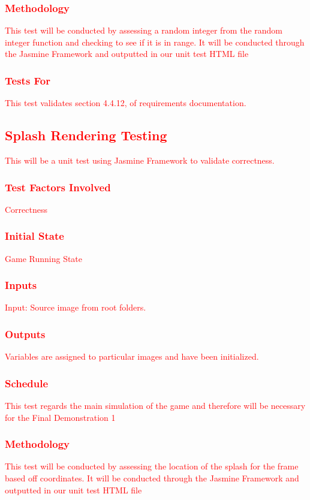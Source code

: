 \documentclass[11pt, oneside]{article}   	%
\begin{document}
\subsubsection{\textcolor{red}{Methodology}}
\textcolor{red}{This test will be conducted by assessing a random integer from the random integer function and checking to see if it is in range. It will be conducted through the Jasmine Framework and outputted in our unit test HTML file}
\subsubsection{\textcolor{red}{Tests For}}
\textcolor{red}{This test validates section 4.4.12, of requirements documentation.}


\subsection{\textcolor{red}{Splash Rendering Testing}}
\textcolor{red}{This will be a unit test using Jasmine Framework to validate correctness.}
\subsubsection{\textcolor{red}{Test Factors Involved}}
\textcolor{red}{Correctness}
\subsubsection{\textcolor{red}{Initial State}}
\textcolor{red}{Game Running State}
\subsubsection{\textcolor{red}{Inputs}}
\textcolor{red}{Input: Source image from root folders.}
\subsubsection{\textcolor{red}{Outputs}}
\textcolor{red}{Variables are assigned to particular images and have been initialized.}
\subsubsection{\textcolor{red}{Schedule}}
\textcolor{red}{This test regards the main simulation of the game and therefore will be necessary for the Final Demonstration 1}
\subsubsection{\textcolor{red}{Methodology}}
\textcolor{red}{This test will be conducted by assessing the location of the splash for the frame based off coordinates. It will be conducted through the Jasmine Framework and outputted in our unit test HTML file}
\end{document}
